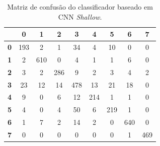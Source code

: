 \begin{table}[H]
	\centering
	\begin{tabular}{c||c|c|c|c|c|c|c|c|}
		\cline{2-9}
		\textbf{}                        & \textbf{0} & \textbf{1} & \textbf{2} & \textbf{3} & \textbf{4} & \textbf{5} & \textbf{6} & \textbf{7} \\ \hline \hline
		\multicolumn{1}{|c||}{\textbf{0}} & 193        & 2          & 1          & 34         & 4          & 10         & 0          & 0          \\ \hline
		\multicolumn{1}{|c||}{\textbf{1}} & 2          & 610        & 0          & 4          & 1          & 1          & 6          & 0          \\ \hline
		\multicolumn{1}{|c||}{\textbf{2}} & 3          & 2          & 286        & 9          & 2          & 3          & 4          & 2          \\ \hline
		\multicolumn{1}{|c||}{\textbf{3}} & 23         & 12         & 14         & 478        & 13         & 21         & 18         & 0          \\ \hline
		\multicolumn{1}{|c||}{\textbf{4}} & 9          & 0          & 6          & 12         & 214        & 1          & 1          & 0          \\ \hline
		\multicolumn{1}{|c||}{\textbf{5}} & 4          & 0          & 4          & 50         & 6          & 219        & 1          & 0          \\ \hline
		\multicolumn{1}{|c||}{\textbf{6}} & 1          & 7          & 2          & 14         & 2          & 0          & 640        & 0          \\ \hline
		\multicolumn{1}{|c||}{\textbf{7}} & 0          & 0          & 0          & 0          & 0          & 0          & 1          & 469        \\ \hline
	\end{tabular}
	\caption{Matriz de confusão do classificador baseado em CNN \textit{Shallow}.}
	\label{tab:mc_CNN_shallow}
\end{table}

